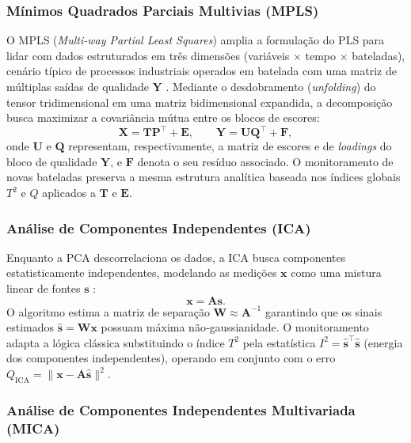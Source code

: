 \documentclass[journal]{IEEEtran}
\begin{document}
\subsubsection{Mínimos Quadrados Parciais Multivias (MPLS)}

O MPLS (\textit{Multi-way Partial Least Squares}) amplia a formulação do PLS para lidar com dados estruturados em três dimensões (variáveis $\times$ tempo $\times$ bateladas), cenário típico de processos industriais operados em batelada com uma matriz de múltiplas saídas de qualidade $\mathbf{Y}$ \cite{nomikos1994}. Mediante o desdobramento (\textit{unfolding}) do tensor tridimensional em uma matriz bidimensional expandida, a decomposição busca maximizar a covariância mútua entre os blocos de escores:
\begin{equation}
\mathbf{X} = \mathbf{T} \mathbf{P}^\top + \mathbf{E}, \qquad \mathbf{Y} = \mathbf{U} \mathbf{Q}^\top + \mathbf{F},
\label{eq:mpls_model}
\end{equation}
onde $\mathbf{U}$ e $\mathbf{Q}$ representam, respectivamente, a matriz de escores e de \textit{loadings} do bloco de qualidade $\mathbf{Y}$, e $\mathbf{F}$ denota o seu resíduo associado. O monitoramento de novas bateladas preserva a mesma estrutura analítica baseada nos índices globais $T^2$ e $Q$ aplicados a $\mathbf{T}$ e $\mathbf{E}$.
\subsubsection{Análise de Componentes Independentes (ICA)}

Enquanto a PCA descorrelaciona os dados, a ICA busca componentes estatisticamente independentes, modelando as medições $\mathbf{x}$ como uma mistura linear de fontes $\mathbf{s}$ \cite{yin2012}:
\begin{equation}
\mathbf{x} = \mathbf{A} \mathbf{s}.
\label{eq:ica_model}
\end{equation}
O algoritmo estima a matriz de separação $\mathbf{W} \approx \mathbf{A}^{-1}$ garantindo que os sinais estimados $\hat{\mathbf{s}} = \mathbf{W} \mathbf{x}$ possuam máxima não‑gaussianidade. O monitoramento adapta a lógica clássica substituindo o índice $T^2$ pela estatística $I^2 = \hat{\mathbf{s}}^\top \hat{\mathbf{s}}$ (energia dos componentes independentes), operando em conjunto com o erro $Q_{\text{ICA}} = \|\mathbf{x} - \mathbf{A}\hat{\mathbf{s}}\|^2$.

\subsubsection{Análise de Componentes Independentes Multivariada (MICA)}
\end{document}
